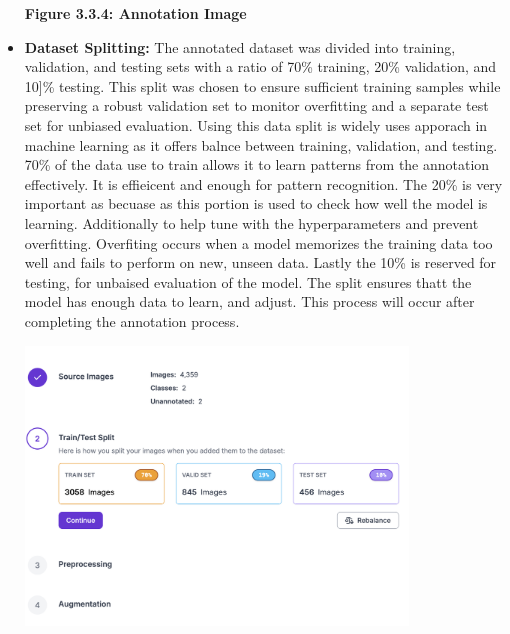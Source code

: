 \begin{itemize}
\begin{center}
		\vspace{0.5em}
		\textbf{Figure 3.3.4: Annotation Image}
	\end{center}
	\newpage
	\item \textbf{Dataset Splitting:}  The annotated dataset was divided into training, validation, and testing sets with a ratio of 70\% training, 20\% validation, and 10]\% testing. This split was chosen to ensure sufficient training samples while preserving a robust validation set to monitor overfitting and a separate test set for unbiased evaluation. Using this data split is widely uses apporach in machine learning as it offers balnce between training, validation, and testing. 70\% of the data use to train allows it to learn patterns from the annotation effectively. It is effieicent and enough for pattern recognition. The 20\% is very important as becuase as this portion is used to check how well the model is learning. Additionally to help tune with the hyperparameters and prevent overfitting. Overfiting occurs when a  model memorizes the training data too well and fails to perform on new, unseen data.  Lastly the 10\% is reserved for testing, for unbaised evaluation of the model. The split ensures thatt the model has enough data to learn, and adjust. This process will occur after completing the annotation process.		
		\begin{center}
		\includegraphics[width=0.8\textwidth]{Split.png}
		

\end{center}
\end{itemize}
